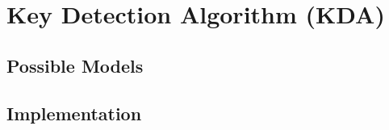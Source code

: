 \section{Key Detection Algorithm (KDA)}

\subsection{Possible Models}


\subsection{Implementation}
